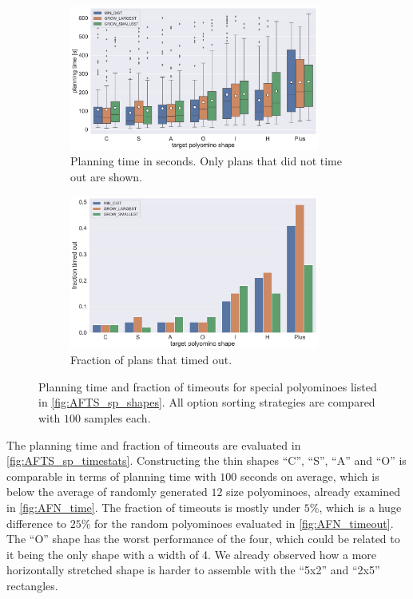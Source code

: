 \begin{figure}
	\centering
	\begin{subfigure}[b]{\textwidth}
		\centering
		\includegraphics[width=0.9\textwidth]{figures/plots/AFTS_sp_time.pdf}
		\caption{Planning time in seconds. Only plans that did not time out are shown.}
		\label{fig:AFTS_sp_time}
	\end{subfigure}
	
	\begin{subfigure}[b]{\textwidth}
		\centering
		\includegraphics[width=0.9\textwidth]{figures/plots/AFTS_sp_timeout.pdf}
		\caption{Fraction of plans that timed out.}
		\label{fig:AFTS_sp_timeout}
	\end{subfigure}
	\caption[Planning time and fraction of timeouts for special polyominoes]{Planning time and fraction of timeouts for special polyominoes listed in \autoref{fig:AFTS_sp_shapes}. All option sorting strategies are compared with $100$ samples each.}
	\label{fig:AFTS_sp_timestats}
\end{figure}

The planning time and fraction of timeouts are evaluated in \autoref{fig:AFTS_sp_timestats}.
Constructing the thin shapes ``C'', ``S'', ``A'' and ``O'' is comparable in terms of planning time with $100$ seconds on average, which is below the average of randomly generated $12$ size polyominoes, already examined in \autoref{fig:AFN_time}.
The fraction of timeouts is mostly under $5\%$, which is a huge difference to $25\%$ for the random polyominoes evaluated in \autoref{fig:AFN_timeout}.
The ``O'' shape has the worst performance of the four, which could be related to it being the only shape with a width of 4.
We already observed how a more horizontally stretched shape is harder to assemble with the ``5x2'' and ``2x5'' rectangles.

